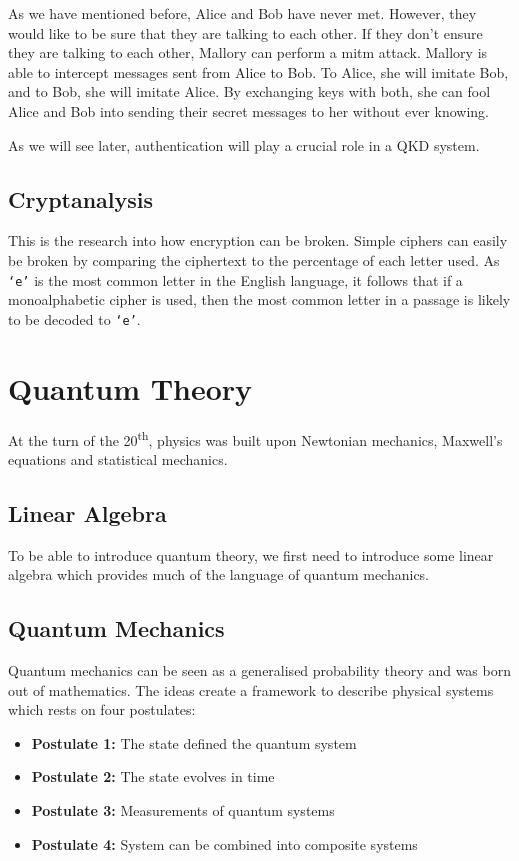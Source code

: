 As we have mentioned before, Alice and Bob have never met. However, they would like to be sure that they are talking to each other. If they don't ensure they are talking to each other, Mallory can perform a \ac{mitm} attack. Mallory is able to intercept messages sent from Alice to Bob. To Alice, she will imitate Bob, and to Bob, she will imitate Alice. By exchanging keys with both, she can fool Alice and Bob into sending their secret messages to her without ever knowing.

As we will see later, authentication will play a crucial role in a \ac{QKD} system.

\subsection{Cryptanalysis}
\label{sec1:cryptanalysis}

This is the research into how encryption can be broken. Simple ciphers can easily be broken by comparing the ciphertext to the percentage of each letter used. As {\tt `e'} is the most common letter in the English language, it follows that if a monoalphabetic cipher is used, then the most common letter in a passage is likely to be decoded to {\tt `e'}.

\section{Quantum Theory}

At the turn of the 20\textsuperscript{th}, physics was built upon Newtonian mechanics, Maxwell's equations and statistical mechanics. 

\subsection{Linear Algebra}

To be able to introduce quantum theory, we first need to introduce some linear algebra which provides much of the language of quantum mechanics.

\subsection{Quantum Mechanics}

Quantum mechanics can be seen as a generalised probability theory and was born out of mathematics. The ideas create a framework to describe physical systems which rests on four postulates:

\begin{itemize}
	\item[] \textbf{Postulate 1:} The state defined the quantum system
	\item[] \textbf{Postulate 2:} The state evolves in time
	\item[] \textbf{Postulate 3:} Measurements of quantum systems
	\item[] \textbf{Postulate 4:} System can be combined into composite systems
\end{itemize}

